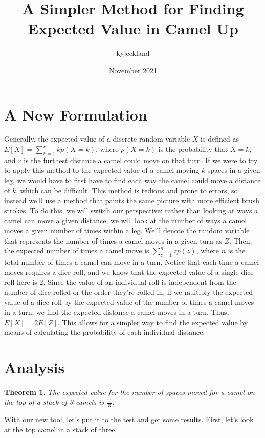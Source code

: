 \documentclass{article}
\title{A Simpler Method for Finding Expected Value in Camel Up}
\author{kyjeckland }
\date{November 2021}
\newtheorem{theorem}{Theorem}[section]
\begin{document}
\maketitle

\section{A New Formulation}
 Generally, the expected value of a discrete random variable $X$ is defined as $E[X] = \sum_{k = 1}^{r}kp(X=k)$, where $p(X = k)$ is the probability that $X = k$, and $r$ is the furthest distance a camel could move on that turn. If we were to try to apply this method to the expected value of a camel moving $k$ spaces in a given leg, we would have to first have to find each way the camel could move a distance of $k$, which can be difficult. This method is tedious and prone to errors, so instead we'll use a method that paints the same picture with more efficient brush strokes. To do this, we will switch our perspective: rather than looking at ways a camel can move a given distance, we will look at the number of ways a camel moves a given number of times within a leg. We'll denote the random variable that represents the number of times a camel moves in a given turn as $Z$. Then, the expected number of times a camel move is $\sum_{z=1}^{n}zp(z)$, where $n$ is the total number of times a camel can move in a turn. Notice that each time a camel moves requires a dice roll, and we know that the expected value of a single dice roll here is $2$. Since the value of an individual roll is independent from the number of dice rolled or the order they're rolled in, if we multiply the expected value of a dice roll by the expected value of the number of times a camel moves in a turn, we find the expected distance a camel moves in a turn. Thus, $E[X] = 2E[Z]$. This allows for a simpler way to find the expected value by means of calculating the probability of each individual distance.

\section{Analysis}

\begin{theorem}
  The expected value for the number of spaces moved for a camel on the top of a stack of 3 camels is $\displaystyle\frac{11}{3}$.
\end{theorem}

With our new tool, let's put it to the test and get some results. First, let's look at the top camel in a stack of three.
\end{document}
